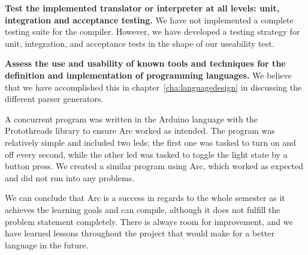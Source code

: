 \textbf{Test the implemented translator or interpreter at all levels: unit, integration and acceptance testing.} We have not implemented a complete testing suite for the compiler. However, we have developed a testing strategy for unit, integration, and acceptance tests in the shape of our useability test.

\textbf{Assess the use and usability of known tools and techniques for the definition and implementation of programming languages.} We believe that we have accomplished this in chapter~\ref{cha:languagedesign} in discussing the different parser generators.

A concurrent program was written in the Arduino language with the Protothreads library to ensure Arc worked as intended. The program was relatively simple and included two \gls{led}s; the first one was tasked to turn on and off every second, while the other \gls{led} was tasked to toggle the light state by a button press. We created a similar program using Arc, which worked as expected and did not run into any problems.

We can conclude that Arc is a success in regards to the whole semester as it achieves the learning goals and can compile, although it does not fulfill the problem statement completely. There is always room for improvement, and we have learned lessons throughout the project that would make for a better language in the future.